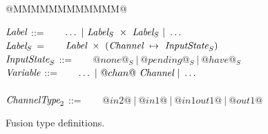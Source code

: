 
\begin{figure}

\begin{tabbing}
@MMMMMMMMMMMM@   \TABDEF \kill

$\textit{Label}$        \> ::=  \> ~~~ $\ldots ~|~\textit{Label}_S~\times~\textit{Label}_S ~|~ \ldots$ \\
$\textit{Label}_S$      \> =    \> ~~~ $\textit{Label}~\times~(\textit{Channel} ~\mapsto~ \textit{InputState}_S)$  \\
$\textit{InputState}_S$ \> ::=  \> ~~~ $@none@_S ~|~ @pending@_S ~|~ @have@_S$    \\
$\textit{Variable}$          \> ::=  \> ~~~ $\ldots ~|~@chan@~\textit{Channel} ~|~ \ldots$ \\
\\

$\textit{ChannelType}_2$   \> ::=  \> ~~~ $@in2@~|~@in1@~|~@in1out1@~|~@out1@$
\end{tabbing}

\caption{Fusion type definitions.}
\label{fig:Fusion:Types}
\end{figure}


